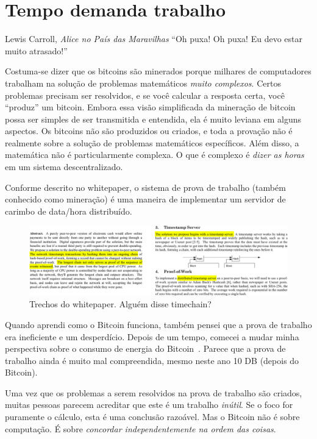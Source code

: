 \chapter{Tempo demanda trabalho}
\label{les:17}

\begin{chapquote}{Lewis Carroll, \textit{Alice no País das Maravilhas}}
\enquote{Oh puxa! Oh puxa! Eu devo estar muito atrasado!}
\end{chapquote}

Costuma-se dizer que os bitcoins são minerados porque milhares de computadores trabalham na solução de problemas matemáticos \textit{muito complexos}. Certos problemas precisam ser resolvidos, e se você calcular a resposta certa, você \enquote{produz} um bitcoin. Embora essa visão simplificada da mineração de bitcoin possa ser simples de ser transmitida e entendida, ela é muito leviana em alguns aspectos. Os bitcoins não são produzidos ou criados, e toda a provação não é realmente sobre a solução de problemas matemáticos específicos. Além disso, a matemática não é particularmente complexa. O que é complexo é \textit{dizer as horas} em um sistema descentralizado.

Conforme descrito no whitepaper, o sistema de prova de trabalho (também conhecido como mineração) é uma maneira de implementar um servidor de carimbo de data/hora distribuído.

\begin{figure}
  \includegraphics{assets/images/bitcoin-whitepaper-timestamp-wide.png}
  \caption{Trechos do whitepaper. Alguém disse timechain?}
  \label{fig:bitcoin-whitepaper-timestamp-wide}
\end{figure}

Quando aprendi como o Bitcoin funciona, também pensei que a prova de trabalho era ineficiente e um desperdício. Depois de um tempo, comecei a mudar minha perspectiva sobre o consumo de energia do Bitcoin~\cite{gigi:energy}. Parece que a prova de trabalho ainda é muito mal compreendida, mesmo neste ano 10 DB (depois do Bitcoin).

Uma vez que os problemas a serem resolvidos na prova de trabalho são criados, muitas pessoas parecem acreditar que este é um trabalho \textit{inútil}. Se o foco for puramente o cálculo, esta é uma conclusão razoável. Mas o Bitcoin não é sobre computação. É sobre \textit{concordar independentemente na ordem das coisas}.

